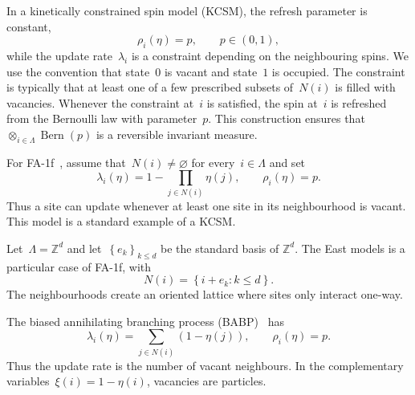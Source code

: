\documentclass[EJP,preprint,NODS,nobera]{ejpecp}
\newcommand{\Z}{\mathbb{Z}}
\newcommand{\bb}[1]{\left(#1\right)}
\newcommand{\cb}[1]{\left\{#1\right\}}
\newcommand{\vn}{\varnothing}
\begin{document}
\begin{example}
In a kinetically constrained spin model (KCSM), the refresh parameter is
constant,
\begin{equation*}
\rho_i(\eta)=p,
\qquad p\in(0,1),
\end{equation*}
while the update rate~$\lambda_i$ is a constraint depending on the neighbouring
spins. We use the convention that state~$0$ is vacant and state~$1$ is occupied. The constraint is typically that at least one of a few prescribed subsets of~$N(i)$ is filled with vacancies. 
Whenever the constraint at~$i$ is satisfied, the spin at~$i$ is refreshed
from the Bernoulli law with parameter~$p$. This construction ensures that~$\otimes_{i\in \Lambda}\operatorname{Bern}(p)$ is a reversible invariant measure.
\end{example}

\begin{example}
For FA-1f~\cite{FredricksonAndersen1984,CancriniEtAl2008,HartarskyToninelli2025},
assume that~$N(i)\neq\vn$ for every~$i\in\Lambda$ and set
\begin{equation*}
\lambda_i(\eta)=1-\prod_{j\in N(i)}\eta(j),
\qquad
\rho_i(\eta)=p.
\end{equation*}
Thus a site can update whenever at least one site in its neighbourhood is
vacant. This model is a standard example of a KCSM.
\end{example}

\begin{example}
Let~$\Lambda=\Z^d$ and let~$\cb{e_k}_{k\leq d}$ be the standard basis of
$\Z^d$. The East models is a particular case of FA-1f, with
\begin{equation*}
N(i)=\cb{i+e_k:k\leq d}.
\end{equation*}
The neighbourhoods create an oriented lattice where sites only interact one-way. 
\end{example}



\begin{example}
The biased annihilating branching process (BABP)~\cite{NeuhauserSudbury1993}
has
\begin{equation*}
\lambda_i(\eta)
=
\sum_{j\in N(i)}\bb{1-\eta(j)},
\qquad
\rho_i(\eta)=p.
\end{equation*}
Thus the update rate is the number of vacant neighbours. In the complementary
variables~$\xi(i)=1-\eta(i)$, vacancies are particles.
\end{example}
\end{document}
